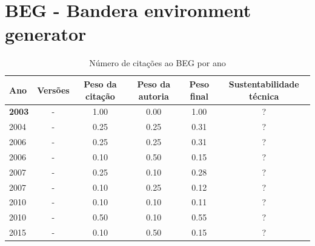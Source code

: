 \section{BEG - Bandera environment generator}



\begin{table}[H]
\caption{Número de citações ao BEG  por ano}
\centering
\begin{tabular}{| l | c | c | c | c | c |}
  \hline
  Ano & Versões & Peso da citação & Peso da autoria & Peso final & Sustentabilidade técnica \\
  \hline
            {\bf 2003}
          &
          -
          &
          1.00
          &
          0.00
          &
            {\color{blue} 1.00}
          &
          ?
          \\
\hline
            2004
          &
          -
          &
          0.25
          &
          0.25
          &
            {\color{red} 0.31}
          &
          ?
          \\
\hline
            2006
          &
          -
          &
          0.25
          &
          0.25
          &
            {\color{red} 0.31}
          &
          ?
          \\
            2006
          &
          -
          &
          0.10
          &
          0.50
          &
            {\color{red} 0.15}
          &
          ?
          \\
\hline
            2007
          &
          -
          &
          0.25
          &
          0.10
          &
            {\color{red} 0.28}
          &
          ?
          \\
            2007
          &
          -
          &
          0.10
          &
          0.25
          &
            {\color{red} 0.12}
          &
          ?
          \\
\hline
            2010
          &
          -
          &
          0.10
          &
          0.10
          &
            {\color{red} 0.11}
          &
          ?
          \\
            2010
          &
          -
          &
          0.50
          &
          0.10
          &
            {\color{blue} 0.55}
          &
          ?
          \\
\hline
            2015
          &
          -
          &
          0.10
          &
          0.50
          &
            {\color{red} 0.15}
          &
          ?
          \\
\hline
\end{tabular}
\end{table}



